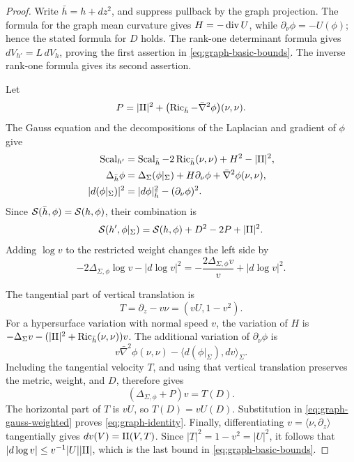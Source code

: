 \begin{proof}
Write \(\bar h=h+dz^2\), and suppress pullback by the graph
projection.  The formula for the graph mean curvature gives
\(H=-\operatorname{div} U\), while \(\partial_\nu\phi=-U(\phi)\); hence the stated
formula for \(D\) holds.  The rank-one determinant formula gives
\(dV_{h'}=L\,dV_h\), proving the first assertion in
\eqref{eq:graph-basic-bounds}.  The inverse rank-one formula gives its
second assertion.

Let
\[
 P=|\mathrm{II}|^2+
   \bigl(\operatorname{Ric}_{\bar h}-\bar\nabla^2\phi\bigr)(\nu,\nu).
\]
The Gauss equation and the decompositions of the Laplacian and
gradient of \(\phi\) give
\begin{align*}
 \operatorname{Scal}_{h'}&=\operatorname{Scal}_{\bar h}-2\operatorname{Ric}_{\bar h}(\nu,\nu)
                 +H^2-|\mathrm{II}|^2,\\
 \Delta_{\bar h}\phi
   &=\Delta_\Sigma(\phi|_\Sigma)
       +H\partial_\nu\phi+\bar\nabla^2\phi(\nu,\nu),\\
 |d(\phi|_\Sigma)|^2&=|d\phi|_{\bar h}^2-(\partial_\nu\phi)^2.
\end{align*}
Since \(\mathcal S(\bar h,\phi)=\mathcal S(h,\phi)\), their combination is
\begin{equation}
 \mathcal S(h',\phi|_\Sigma)
 =\mathcal S(h,\phi)+D^2-2P+|\mathrm{II}|^2.
 \label{eq:graph-gauss-weighted}
\end{equation}
Adding \(\log v\) to the restricted weight changes the left side by
\[
 -2\Delta_{\Sigma,\phi}\log v-|d\log v|^2
 =-\frac{2\Delta_{\Sigma,\phi}v}{v}+|d\log v|^2 .
\]

The tangential part of vertical translation is
\[
 T=\partial_z-v\nu=(vU,1-v^2).
\]
For a hypersurface variation with normal speed \(v\), the variation
of \(H\) is
\(-\Delta_\Sigma v-(|\mathrm{II}|^2+\operatorname{Ric}_{\bar h}(\nu,\nu))v\).
The additional variation of \(\partial_\nu\phi\) is
\[
 v\bar\nabla^2\phi(\nu,\nu)
       -\langle d(\phi|_\Sigma),dv\rangle_\Sigma .
\]
Including the tangential velocity \(T\), and using that vertical
translation preserves the metric, weight, and \(D\), therefore gives
\begin{equation}
 (\Delta_{\Sigma,\phi}+P)v=T(D).
 \label{eq:graph-translation}
\end{equation}
The horizontal part of \(T\) is \(vU\), so \(T(D)=vU(D)\).
Substitution in \eqref{eq:graph-gauss-weighted} proves
\eqref{eq:graph-identity}.  Finally, differentiating
\(v=\langle\nu,\partial_z\rangle\) tangentially gives
\(dv(V)=\mathrm{II}(V,T)\).  Since \(|T|^2=1-v^2=|U|^2\), it follows that
\(|d\log v|\le v^{-1}|U||\mathrm{II}|\), which is the last bound in
\eqref{eq:graph-basic-bounds}.
\end{proof}

